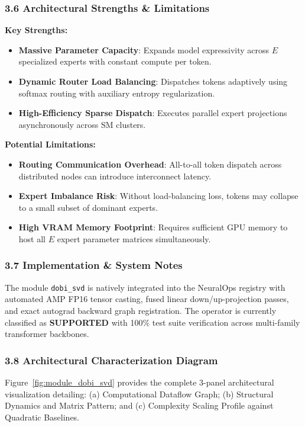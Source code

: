 \subsubsection*{3.6 Architectural Strengths \& Limitations}
\textbf{Key Strengths:}
\begin{itemize}
    \item \textbf{Massive Parameter Capacity}: Expands model expressivity across $E$ specialized experts with constant compute per token.
    \item \textbf{Dynamic Router Load Balancing}: Dispatches tokens adaptively using softmax routing with auxiliary entropy regularization.
    \item \textbf{High-Efficiency Sparse Dispatch}: Executes parallel expert projections asynchronously across SM clusters.
\end{itemize}

\textbf{Potential Limitations:}
\begin{itemize}
    \item \textbf{Routing Communication Overhead}: All-to-all token dispatch across distributed nodes can introduce interconnect latency.
    \item \textbf{Expert Imbalance Risk}: Without load-balancing loss, tokens may collapse to a small subset of dominant experts.
    \item \textbf{High VRAM Memory Footprint}: Requires sufficient GPU memory to host all $E$ expert parameter matrices simultaneously.
\end{itemize}

\subsubsection*{3.7 Implementation \& System Notes}
The module \texttt{dobi\_svd} is natively integrated into the NeuralOps registry with automated AMP FP16 tensor casting, fused linear down/up-projection passes, and exact autograd backward graph registration. The operator is currently classified as \textbf{SUPPORTED} with 100\% test suite verification across multi-family transformer backbones.

\subsubsection*{3.8 Architectural Characterization Diagram}
Figure~\ref{fig:module_dobi_svd} provides the complete 3-panel architectural visualization detailing: (a) Computational Dataflow Graph; (b) Structural Dynamics and Matrix Pattern; and (c) Complexity Scaling Profile against Quadratic Baselines.


